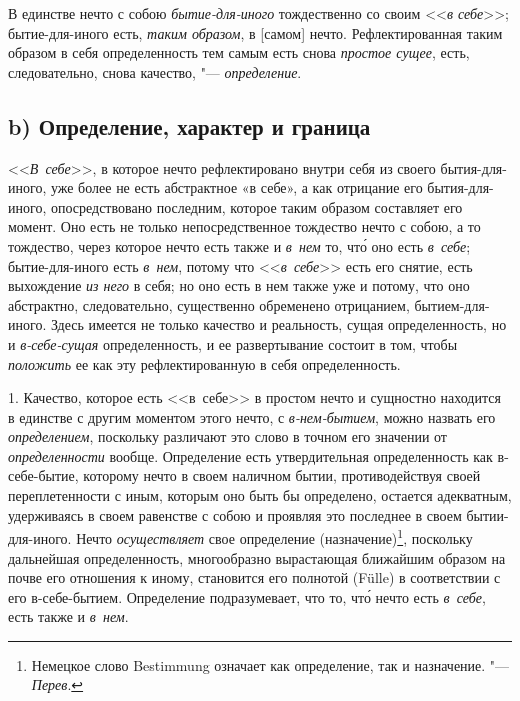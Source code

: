В единстве нечто с собою {\em бытие-для-иного}
тождественно со своим <<{\em в себе}>>; бытие-для-иного
есть, {\em таким образом}, в [самом] нечто.
Рефлектированная таким образом в себя определенность тем самым есть снова
{\em простое сущее}, есть, следовательно, снова
качество, "--- {\em определение}.

\subsection[b) Определение, характер и граница]{b) Определение, характер и граница}
<<{\em В~себе}>>, в которое нечто рефлектировано внутри
себя из своего бытия-для-иного, уже более не есть абстрактное «в себе», а
как отрицание его бытия-для-иного, опосредствовано последним, которое
таким образом составляет его момент. Оно есть не только непосредственное
тождество нечто с собою, а то тождество, через которое нечто есть также и
{\em в~нем} то, чт\'{о} оно есть {\em в~себе};
бытие-для-иного есть {\em в~нем}, потому что
<<{\em в~себе}>> есть его снятие, есть выхождение
{\em из него} в себя; но оно есть в нем также уже и
потому, что оно абстрактно, следовательно, существенно обременено
отрицанием, бытием-для-иного. Здесь имеется не только качество и
реальность, сущая определенность, но и
{\em в-себе-сущая} определенность, и ее развертывание
состоит в том, чтобы {\em положить} ее как эту
рефлектированную в себя определенность.

1. Качество, которое есть <<в~себе>>
в простом нечто и сущностно находится
в единстве с другим моментом этого нечто, с
{\em в-нем-бытием}, можно назвать его
{\em определением}, поскольку различают это слово в
точном его значении от {\em определенности} вообще.
Определение есть утвердительная определенность как в-себе-бытие, которому
нечто в своем наличном бытии, противодействуя своей переплетенности с
иным, которым оно быть бы определено, остается адекватным,
удерживаясь в своем равенстве с собою и проявляя это последнее в своем
бытии-для-иного. Нечто {\em осуществляет} свое
определение (назначение)\footnote{Немецкое слово Bestimmung
означает как определение, так и назначение. "--- {\em Перев}.},
поскольку дальнейшая определенность,
многообразно вырастающая ближайшим образом на почве его отношения к
иному, становится его полнотой (Fülle) в соответствии с его
в-себе-бытием. Определение подразумевает, что то, чт\'{о} нечто есть
{\em в~себе}, есть также и {\em в~нем}.

